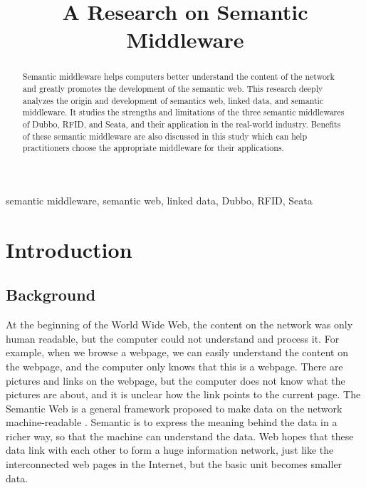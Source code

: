 \documentclass[conference]{IEEEtran}
\begin{document}
\title{A Research on Semantic Middleware\\

}

\author{
}

\maketitle

\begin{abstract}
Semantic middleware helps computers better understand the content of the network and greatly promotes the development of the semantic web. This research deeply analyzes the origin and development of semantics web, linked data, and semantic middleware.  It studies the strengths and limitations of the three semantic middlewares of Dubbo, RFID, and Seata, and their application in the real-world industry. Benefits of these semantic middleware are also discussed in this study which can help practitioners choose the appropriate middleware for their applications.

\end{abstract}

\begin{IEEEkeywords}
semantic middleware, semantic web, linked data, Dubbo, RFID, Seata
\end{IEEEkeywords}

\section{Introduction}
\subsection{Background}

At the beginning of the World Wide Web, the content on the network was only human readable, but the computer could not understand and process it. For example, when we browse a webpage, we can easily understand the content on the webpage, and the computer only knows that this is a webpage. There are pictures and links on the webpage, but the computer does not know what the pictures are about, and it is unclear how the link points to the current page. The Semantic Web is a general framework proposed to make data on the network machine-readable \cite{b1}. Semantic is to express the meaning behind the data in a richer way, so that the machine can understand the data. Web hopes that these data link with each other to form a huge information network, just like the interconnected web pages in the Internet, but the basic unit becomes smaller data.
\end{document}
